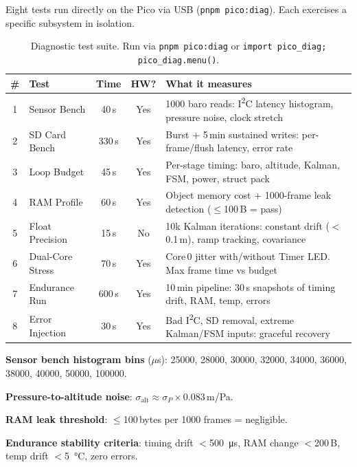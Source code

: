 \documentclass[11pt, a4paper, twoside]{article}
\begin{document}
Eight tests run directly on the Pico via USB (\texttt{pnpm pico:diag}). Each exercises a specific subsystem in isolation.

\begin{table}[ht]
\centering
\small
\caption{Diagnostic test suite. Run via \texttt{pnpm pico:diag} or \texttt{import pico\_diag; pico\_diag.menu()}.}
\label{tab:diag}
\begin{tabularx}{\textwidth}{c l c c X}
\toprule
\textbf{\#} & \textbf{Test} & \textbf{Time} & \textbf{HW?} & \textbf{What it measures} \\
\midrule
1 & Sensor Bench & 40\,s & Yes & 1000 baro reads: I\textsuperscript{2}C latency histogram, pressure noise, clock stretch \\
2 & SD Card Bench & 330\,s & Yes & Burst + 5\,min sustained writes: per-frame/flush latency, error rate \\
3 & Loop Budget & 45\,s & Yes & Per-stage timing: baro, altitude, Kalman, FSM, power, struct pack \\
4 & RAM Profile & 60\,s & Yes & Object memory cost + 1000-frame leak detection ($\leq$100\,B = pass) \\
5 & Float Precision & 15\,s & No & 10k Kalman iterations: constant drift ($<$0.1\,m), ramp tracking, covariance \\
6 & Dual-Core Stress & 70\,s & Yes & Core\,0 jitter with/without Timer LED. Max frame time vs budget \\
7 & Endurance Run & 600\,s & Yes & 10\,min pipeline: 30\,s snapshots of timing drift, RAM, temp, errors \\
8 & Error Injection & 30\,s & Yes & Bad I\textsuperscript{2}C, SD removal, extreme Kalman/FSM inputs: graceful recovery \\
\bottomrule
\end{tabularx}
\end{table}

\textbf{Sensor bench histogram bins} ($\mu$s): 25000, 28000, 30000, 32000, 34000, 36000, 38000, 40000, 50000, 100000.

\textbf{Pressure-to-altitude noise}: $\sigma_\text{alt} \approx \sigma_P \times 0.083$\,m/Pa.

\textbf{RAM leak threshold}: $\leq$100\,bytes per 1000 frames = negligible.

\textbf{Endurance stability criteria}: timing drift $<$\SI{500}{\micro\second}, RAM change $<$200\,B, temp drift $<$\SI{5}{\degreeCelsius}, zero errors.

\end{document}
